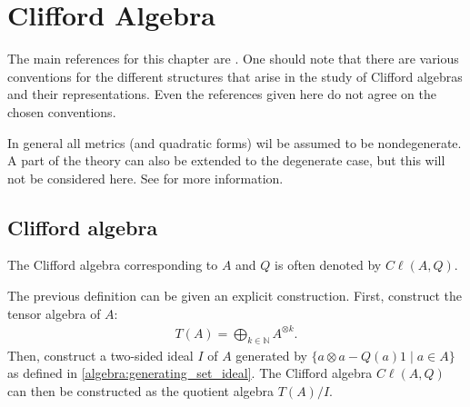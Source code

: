 \chapter{Clifford Algebra}\label{chapter:clifford}

    The main references for this chapter are \cite{AMP1, AMP2, gallier_clifford}. One should note that there are various conventions for the different structures that arise in the study of Clifford algebras and their representations. Even the references given here do not agree on the  chosen conventions.

    In general all metrics (and quadratic forms) wil be assumed to be nondegenerate. A part of the theory can also be extended to the degenerate case, but this will not be considered here. See \cite{gallier_clifford} for more information.

\section{Clifford algebra}

    \begin{notation}
        The Clifford algebra corresponding to $A$ and $Q$ is often denoted by $C\ell(A,Q)$.
    \end{notation}

    \begin{construct}
        The previous definition can be given an explicit construction. First, construct the tensor algebra of $A$:
        \begin{gather}
            T(A) = \bigoplus_{k\in\mathbb{N}}A^{\otimes k}.
        \end{gather}
        Then, construct a two-sided ideal $I$ of $A$ generated by $\{a\otimes a - Q(a)1\mid a\in A\}$ as defined in \ref{algebra:generating_set_ideal}. The Clifford algebra $C\ell(A,Q)$ can then be constructed as the quotient algebra $T(A)/I$.
    \end{construct}

